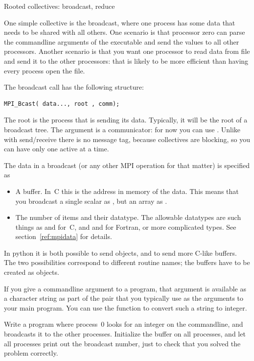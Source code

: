  {Rooted collectives: broadcast, reduce}

One simple collective is the broadcast, where one process has some
data that needs to be shared with all others. One scenario is that
processor zero can parse the commandline arguments of the executable
and send the values to all other processors.
Another scenario is that you want one processor to read data from file
and send it to the other processors: that is likely to be more efficient
than having every process open the file.

The broadcast call has the following structure:
\begin{verbatim}
MPI_Bcast( data..., root , comm);
\end{verbatim}
The root is the process that is sending its data.
Typically, it will be the root of a broadcast tree.
The  argument is a communicator:
for now you can use .
Unlike with send/receive there is no message tag,
because collectives are blocking, so you can have only one active at a
time. 

The data in a broadcast (or any other MPI operation for that matter)
is specified as
\begin{itemize}
\item A buffer. In~C this is the address in memory of the data. This means
  that you broadcast a single scalar as ,
  but an array as .
\item The number of items and their datatype. The allowable datatypes
  are such things as  and  for~C, and
   and  for Fortran, or more complicated types.
  See section~\ref{ref:mpidata} for details.
\end{itemize}
\begin{pythonnote}
  In python it is both possible to send objects, and to send
  more C-like buffers. The two possibilities correspond to
  different routine names; the buffers have to be created as 
  objects.
\end{pythonnote}

\begin{exercise}
  \label{ex:argv-bcast}
  If you give a commandline argument to a program, that argument is available
  as a character string as part of the  pair that you typically use
  as the arguments to your main program. You can use the function  to
  convert such a string to integer.

  Write a program where process~0 looks for an integer on the commandline, and
  broadcasts it to the other processes. Initialize the buffer on all processes, and
  let all processes print out the broadcast number,
  just to check that you solved the problem correctly.
\end{exercise}

